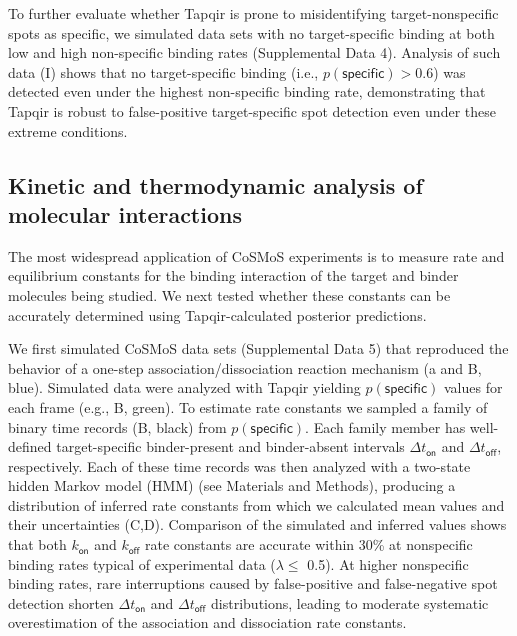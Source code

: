 To further evaluate whether Tapqir is prone to misidentifying target-nonspecific spots as specific, we  simulated data sets with no target-specific binding at both low and high non-specific binding rates (Supplemental Data 4). Analysis of such data (I) shows that no target-specific binding (i.e., $p(\mathsf{specific}) > 0.6$) was detected even under the highest non-specific binding rate, demonstrating that Tapqir is robust to false-positive target-specific spot detection even under these extreme conditions. 

\subsection{Kinetic and thermodynamic analysis of molecular interactions}

The most widespread application of CoSMoS experiments is to measure rate and equilibrium constants for the binding interaction of the target and binder molecules being studied.  We next tested whether these constants can be accurately determined using Tapqir-calculated posterior predictions. 

We first simulated CoSMoS data sets (Supplemental Data 5) that reproduced the behavior of a one-step association/dissociation reaction mechanism (a and B, blue). Simulated data were analyzed with Tapqir yielding $p(\mathsf{specific})$ values for each frame (e.g., B, green). To estimate rate constants we sampled a family of binary time records (B, black) from $p(\mathsf{specific})$. Each family member has well-defined target-specific binder-present and binder-absent intervals $\Delta t_\mathsf{on}$ and $\Delta t_\mathsf{off}$, respectively. Each of these time records was then analyzed with a two-state hidden Markov model (HMM) (see Materials and Methods), producing a distribution of inferred rate constants from which we calculated mean values and their uncertainties (C,D). Comparison of the simulated and inferred values shows that both $k_\mathsf{on}$ and $k_\mathsf{off}$ rate constants are accurate within 30\% at nonspecific binding rates typical of experimental data ($\lambda \leq$ 0.5). At higher nonspecific binding rates, rare interruptions caused by false-positive and false-negative spot detection shorten $\Delta t_\mathsf{on}$ and $\Delta t_\mathsf{off}$ distributions, leading to moderate systematic overestimation of the association and dissociation rate constants.

